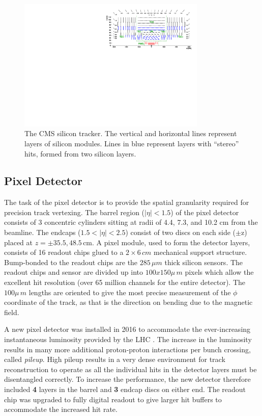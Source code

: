 \begin{figure}[hbp!]
\centering
\includegraphics[width=0.8\textwidth]{figs/TrackerLayoutNew.pdf}
\caption[The CMS silicon tracker]{The CMS silicon tracker. The vertical and horizontal lines represent layers of silicon modules. Lines in blue represent layers with ``stereo'' hits, formed from two silicon layers.}
\label{fig:tracker}
\end{figure}

\subsection{Pixel Detector}

The task of the pixel detector is to provide the spatial granularity required for precision track vertexing. The barrel region ($|\eta|<1.5$) of the pixel detector consists of 3 concentric cylinders sitting at radii of 4.4, 7.3, and 10.2 cm from the beamline. The endcaps ($1.5<|\eta|<2.5$) consist of two discs on each side ($\pm$z) placed at $z = \pm 35.5, 48.5\,\textrm{cm}$. A pixel module, used to form the detector layers, consists of 16 readout chips glued to a $2\times6\,cm$ mechanical support structure. Bump-bonded to the readout chips are the $285\,\mu m$ thick silicon sensors. The readout chips and sensor are divided up into $100x150\mu\,m$ pixels which allow the excellent hit resolution (over 65 million channels for the entire detector). The $100\mu\,m$ lengths are oriented to give the most precise measurement of the $\phi$ coordinate of the track, as that is the direction on bending due to the magnetic field.  

A new pixel detector was installed in 2016 to accommodate the ever-increasing instantaneous luminosity provided by the LHC \cite{newpixel}. The increase in the luminosity results in many more additional proton-proton interactions per bunch crossing, called \textit{pileup}.  High pileup results in a very dense environment for track reconstruction to operate as all the individual hits in the detector layers must be disentangled correctly. To increase the performance, the new detector therefore included \textbf{4} layers in the barrel and \textbf{3} endcap discs on either end. The readout chip was upgraded to fully digital readout to give larger hit buffers to accommodate the increased hit rate.

